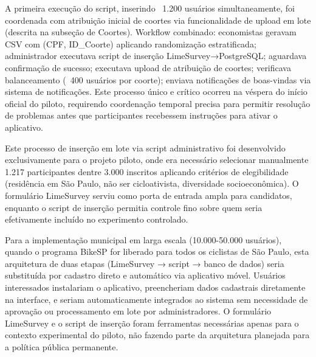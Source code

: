 A primeira execução do script, inserindo ~1.200 usuários simultaneamente, foi coordenada com atribuição inicial de coortes via funcionalidade de upload em lote (descrita na subseção de Coortes). Workflow combinado: economistas geravam CSV com (CPF, ID\_Coorte) aplicando randomização estratificada; administrador executava script de inserção LimeSurvey→PostgreSQL; aguardava confirmação de sucesso; executava upload de atribuição de coortes; verificava balanceamento (~400 usuários por coorte); enviava notificações de boas-vindas via sistema de notificações. Este processo único e crítico ocorreu na véspera do início oficial do piloto, requirendo coordenação temporal precisa para permitir resolução de problemas antes que participantes recebessem instruções para ativar o aplicativo.

Este processo de inserção em lote via script administrativo foi desenvolvido exclusivamente para o projeto piloto, onde era necessário selecionar manualmente 1.217 participantes dentre 3.000 inscritos aplicando critérios de elegibilidade (residência em São Paulo, não ser cicloativista, diversidade socioeconômica). O formulário LimeSurvey serviu como porta de entrada ampla para candidatos, enquanto o script de inserção permitia controle fino sobre quem seria efetivamente incluído no experimento controlado.

Para a implementação municipal em larga escala (10.000-50.000 usuários), quando o programa BikeSP for liberado para todos os ciclistas de São Paulo, esta arquitetura de duas etapas (LimeSurvey → script → banco de dados) seria substituída por cadastro direto e automático via aplicativo móvel. Usuários interessados instalariam o aplicativo, preencheriam dados cadastrais diretamente na interface, e seriam automaticamente integrados ao sistema sem necessidade de aprovação ou processamento em lote por administradores. O formulário LimeSurvey e o script de inserção foram ferramentas necessárias apenas para o contexto experimental do piloto, não fazendo parte da arquitetura planejada para a política pública permanente.


